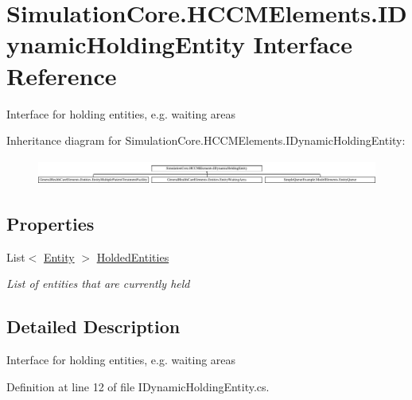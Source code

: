 \hypertarget{interface_simulation_core_1_1_h_c_c_m_elements_1_1_i_dynamic_holding_entity}{}\section{Simulation\+Core.\+H\+C\+C\+M\+Elements.\+I\+Dynamic\+Holding\+Entity Interface Reference}
\label{interface_simulation_core_1_1_h_c_c_m_elements_1_1_i_dynamic_holding_entity}


Interface for holding entities, e.\+g. waiting areas  


Inheritance diagram for Simulation\+Core.\+H\+C\+C\+M\+Elements.\+I\+Dynamic\+Holding\+Entity\+:\begin{figure}[H]
\begin{center}
\leavevmode
\includegraphics[height=0.856269cm]{interface_simulation_core_1_1_h_c_c_m_elements_1_1_i_dynamic_holding_entity}
\end{center}
\end{figure}
\subsection*{Properties}
\begin{DoxyCompactItemize}
\item 
List$<$ \hyperlink{class_simulation_core_1_1_h_c_c_m_elements_1_1_entity}{Entity} $>$ \hyperlink{interface_simulation_core_1_1_h_c_c_m_elements_1_1_i_dynamic_holding_entity_a896bbc03165a90d8c4a9470c4ebe3d87}{Holded\+Entities}
\begin{DoxyCompactList}\small\item\em List of entities that are currently held \end{DoxyCompactList}\end{DoxyCompactItemize}


\subsection{Detailed Description}
Interface for holding entities, e.\+g. waiting areas 



Definition at line 12 of file I\+Dynamic\+Holding\+Entity.\+cs.



